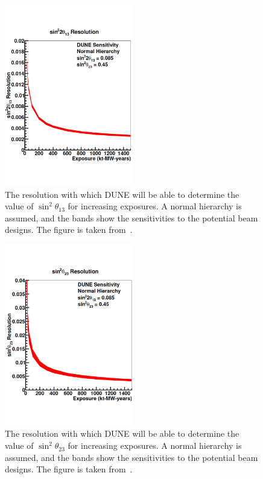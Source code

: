 \begin{figure}[h!]
  \centering
  \includegraphics[width=0.5\textwidth]{DUNETheta13Res}
  \caption[The resolution with which DUNE will be able to determine the value of $\sin^{2}\theta_{13}$ for increasing exposures]
          {The resolution with which DUNE will be able to determine the value of $\sin^{2}\theta_{13}$ for increasing exposures. A normal hierarchy is assumed, and the bands show the sensitivities to the potential beam designs. The figure is taken from~\citep{DUNECDR_V2}.}
  \label{fig:DUNETheta13Res}
\end{figure}

\begin{figure}[h!]
  \centering
  \includegraphics[width=0.5\textwidth]{DUNETheta23Res}
  \caption[The resolution with which DUNE will be able to determine the value of $\sin^{2}\theta_{23}$ for increasing exposures]
          {The resolution with which DUNE will be able to determine the value of $\sin^{2}\theta_{23}$ for increasing exposures. A normal hierarchy is assumed, and the bands show the sensitivities to the potential beam designs. The figure is taken from~\citep{DUNECDR_V2}.}
  \label{fig:DUNETheta23Res}
\end{figure}

